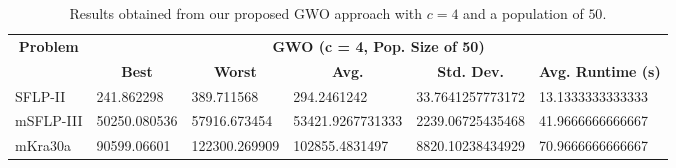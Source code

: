 \begin{table}[h!]
	\begin{adjustwidth}{-1.18in}{}
		\centering
		\begin{tabular}{|l|l|l|l|l|l|}
			\hline
			\multicolumn{1}{|c|}{\multirow{2}{*}{\textbf{Problem}}} & \multicolumn{5}{c|}{\textbf{GWO (c = 4, Pop. Size of 50)}} \\ \cline{2-6} 
			\multicolumn{1}{|c|}{}                                  & \multicolumn{1}{c|}{\textbf{Best}} & \multicolumn{1}{c|}{\textbf{Worst}} & \multicolumn{1}{c|}{\textbf{Avg.}} & \multicolumn{1}{c|}{\textbf{Std. Dev.}} & \multicolumn{1}{c|}{\textbf{Avg. Runtime (s)}} \\ \hline
			SFLP-II                                                 & 241.862298                                  & 389.711568                                   & 294.2461242                      & 33.7641257773172                                 & 13.1333333333333                                  \\ \hline
			mSFLP-III                                               & 50250.080536                                & 57916.673454                                 & 53421.9267731333						         & 2239.06725435468                              & 41.9666666666667                               \\ \hline
			mKra30a                                               & 90599.06601                                & 122300.269909                                 &
			102855.4831497							&
			8820.10238434929							&
			70.9666666666667						\\ \hline
		\end{tabular}
	\end{adjustwidth}
	\caption{Results obtained from our proposed GWO approach with $c = 4$ and a population of $50$.}
	\label{approach-gwo-c4-p50-results}
\end{table}

